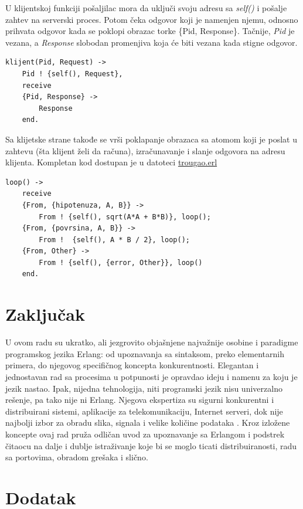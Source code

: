 \documentclass[a4paper]{article}
\begin{document}
{U klijentskoj funkciji pošaljilac mora da uključi svoju adresu sa {\em self()} i pošalje zahtev na serverski proces.
Potom čeka odgovor koji je namenjen njemu, odnosno prihvata odgovor kada se poklopi obrazac torke \{Pid, Response\}. Tačnije, {\em Pid} je vezana, a {\em Response} slobodan promenjiva koja će biti vezana kada stigne odgovor.
\begin{verbatim}
klijent(Pid, Request) ->
    Pid ! {self(), Request},
    receive
	{Pid, Response} ->
	    Response
    end.
\end{verbatim}

Sa klijetske strane takođe se vrši poklapanje obrazaca sa atomom koji je poslat u zahtevu (šta klijent želi da računa), 
izračunavanje i slanje odgovora na adresu klijenta.
Kompletan kod dostupan je u datoteci \href{https://raw.githubusercontent.com/mrdakj/msnr/master/trougao.erl}{trougao.erl}
\begin{verbatim}
loop() ->
    receive
	{From, {hipotenuza, A, B}} -> 
	    From ! {self(), sqrt(A*A + B*B)}, loop();
	{From, {povrsina, A, B}} -> 
	    From !  {self(), A * B / 2}, loop();
	{From, Other} ->
	    From ! {self(), {error, Other}}, loop()
    end.
\end{verbatim}

\section{Zaključak}
\label{sec:zakljucak}
U ovom radu su ukratko, ali jezgrovito objašnjene najvažnije osobine i paradigme programskog jezika Erlang: 
od upoznavanja sa sintaksom, preko elementarnih primera, do njegovog specifičnog koncepta konkurentnosti. 
Elegantan i jednostavan rad sa procesima u potpunosti je opravdao ideju i namenu za koju je jezik nastao.
Ipak, nijedna tehnologija, niti programski jezik nisu univerzalno rešenje, pa tako nije ni Erlang. Njegova ekspertiza su sigurni konkurentni i distribuirani
sistemi, aplikacije za telekomunikaciju, Internet serveri, dok nije najbolji izbor za obradu slika, signala i velike količine podataka \cite{sajt}. 
Kroz izložene koncepte ovaj rad pruža odličan uvod za upoznavanje sa Erlangom i podstrek čitaocu na dalje i dublje istraživanje koje bi se moglo ticati distribuiranosti, radu sa portovima, obradom grešaka i slično.


\appendix
 


\newpage
\appendix
\section{Dodatak}

}
\end{document}
